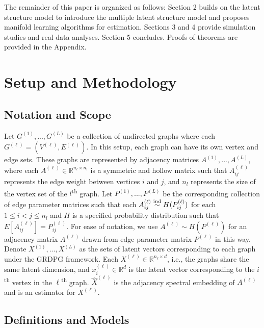 \documentclass[12pt]{article}
\begin{document}
The remainder of this paper is organized as follows: Section 2 builds on
the latent structure model to introduce the multiple latent structure
model and proposes manifold learning algorithms for estimation. Sections
3 and 4 provide simulation studies and real data analyses. Section 5
concludes. Proofs of theorems are provided in the Appendix.

\section{Setup and Methodology}\label{setup-and-methodology}

\subsection{Notation and Scope}\label{notation-and-scope}

Let \(G^{(1)}, ..., G^{(L)}\) be a collection of undirected graphs where
each \(G^{(\ell)} = (V^{(\ell)}, E^{(\ell)})\). In this setup, each
graph can have its own vertex and edge sets. These graphs are
represented by adjacency matrices \(A^{(1)}, ..., A^{(L)}\), where each
\(A^{(\ell)} \in \mathbb{R}^{n_l \times n_l}\) is a symmetric and hollow
matrix such that \(A^{(\ell)}_{ij}\) represents the edge weight between
vertices \(i\) and \(j\), and \(n_l\) represents the size of the vertex
set of the \(l\)\textsuperscript{th} graph. Let
\(P^{(1)}, ..., P^{(L)}\) be the corresponding collection of edge
parameter matrices such that each
\(A^{(\ell)}_{ij} \stackrel{\mathrm{ind}}{\sim} H(P^{(\ell)}_{ij})\) for each
\(1 \leq i < j \leq n_l\) and \(H\) is a specified probability
distribution such that \(E[A^{(\ell)}_{ij}] = P^{(\ell)}_{ij}\). For
ease of notation, we use \(A^{(\ell)} \sim H(P^{(\ell)})\) for an
adjacency matrix \(A^{(\ell)}\) drawn from edge parameter matrix
\(P^{(\ell)}\) in this way. Denote \(X^{(1)}, ..., X^{(L)}\) as the sets
of latent vectors corresponding to each graph under the GRDPG framework.
Each \(X^{(\ell)} \in \mathbb{R}^{n_\ell \times d}\), i.e., the graphs
share the same latent dimension, and \(x_i^{(\ell)} \in \mathbb{R}^d\)
is the latent vector corresponding to the \(i\)\textsuperscript{th}
vertex in the \(\ell\)\textsuperscript{th} graph. \(\hat{X}^{(\ell)}\)
is the adjacency spectral embedding of \(A^{(\ell)}\) and is an
estimator for \(X^{(\ell)}\).

\subsection{Definitions and Models}\label{definitions-and-models}
\end{document}
